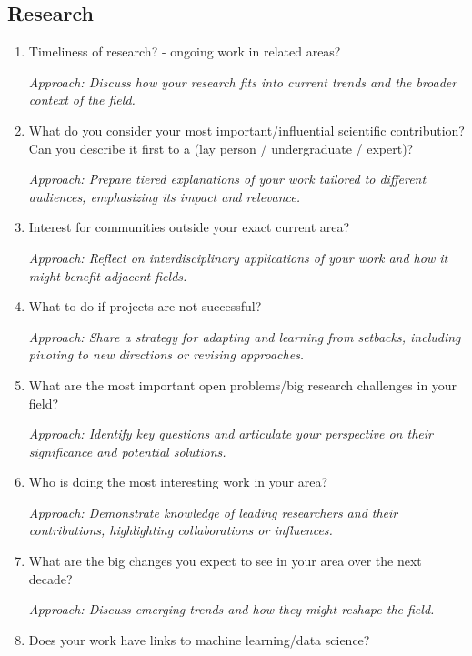 \documentclass[12pt]{article}
\numberwithin{equation}{section}
\begin{document}
\subsection{Research}
\begin{enumerate}
    \item Timeliness of research? - ongoing work in related areas?
    
    \textit{Approach: Discuss how your research fits into current trends and the broader context of the field.}

    \item What do you consider your most important/influential scientific contribution? Can you describe it first to a (lay person / undergraduate / expert)?
    
    \textit{Approach: Prepare tiered explanations of your work tailored to different audiences, emphasizing its impact and relevance.}

    \item Interest for communities outside your exact current area?
    
    \textit{Approach: Reflect on interdisciplinary applications of your work and how it might benefit adjacent fields.}

    \item What to do if projects are not successful?
    
    \textit{Approach: Share a strategy for adapting and learning from setbacks, including pivoting to new directions or revising approaches.}

    \item What are the most important open problems/big research challenges in your field?
    
    \textit{Approach: Identify key questions and articulate your perspective on their significance and potential solutions.}

    \item Who is doing the most interesting work in your area?
    
    \textit{Approach: Demonstrate knowledge of leading researchers and their contributions, highlighting collaborations or influences.}

    \item What are the big changes you expect to see in your area over the next decade?
    
    \textit{Approach: Discuss emerging trends and how they might reshape the field.}

    \item Does your work have links to machine learning/data science?
    

\end{enumerate}
\end{document}
